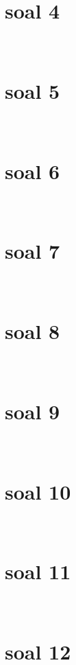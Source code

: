     	\section*{soal 4}\\
    
		\section*{soal 5}\\
    
    	\section*{soal 6}\\
    
    	\section*{soal 7}\\
    
    	\section*{soal 8}\\
    
    	\section*{soal 9}\\
    
    	\section*{soal 10}\\
    
    	\section*{soal 11}\\
    
    	\section*{soal 12}\\
    
        
